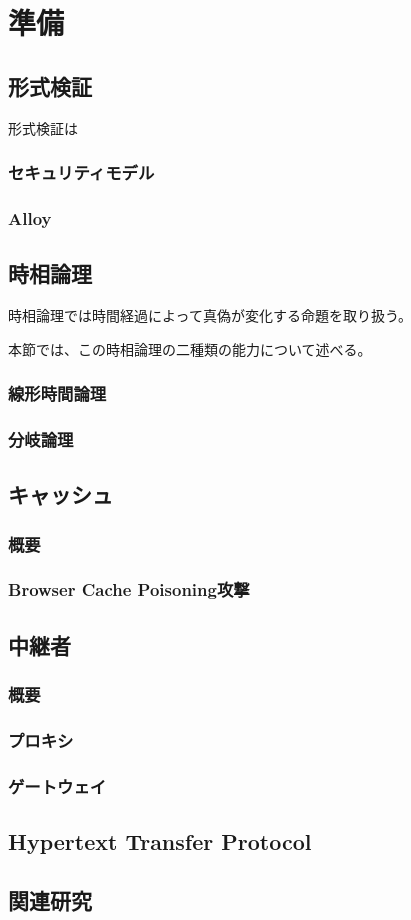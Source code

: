\chapter{準備}
\section{形式検証}
形式検証は

\subsection{セキュリティモデル}

\subsection{Alloy}


\section{時相論理}
時相論理では時間経過によって真偽が変化する命題を取り扱う。

本節では、この時相論理の二種類の能力について述べる。

\subsection{線形時間論理}


\subsection{分岐論理}


\section{キャッシュ}
\subsection{概要}
\subsection{Browser Cache Poisoning攻撃}

\section{中継者}
\subsection{概要}
\subsection{プロキシ}
\subsection{ゲートウェイ}

\section{Hypertext Transfer Protocol}

\section{関連研究}
